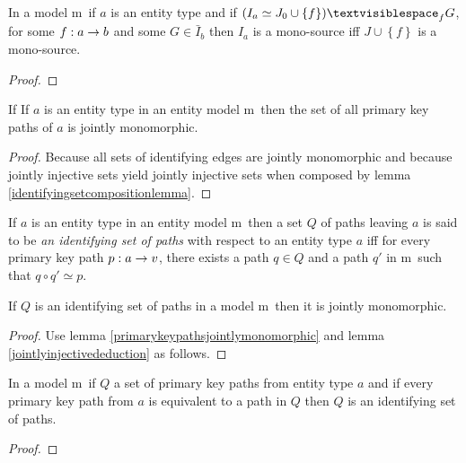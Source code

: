 \documentclass[10pt,a4paper]{article}
\newcommand{\commentary}[1]{\marginpar{\footnotesize #1}}
\newcommand{\set}[1]{\left\{#1\right\}}
\newcommand{\genericmodel}{\mathcal{M}}
\renewcommand{\genericmodel}{{m}}
\newcommand{\term}[1]{\textit{{#1}}}
\begin{document}
\begin{lemma}
In a model \genericmodel\ if $a$ is an entity type and if $(I_a \simeq J_0 \cup \set{f})\textvisiblespace_f G$,
for some $f: a \rightarrow b$ and some $G \in \bar{I}_b$ then 
$I_a$ is a mono-source iff $J \cup \set{f}$ is a mono-source.
\end{lemma}
\begin{proof}
\end{proof} 


\begin{lemma}
\label{primarykeypathsjointlymonomorphic}
If If $a$ is an entity type in an entity model \genericmodel\ then the set of all primary key paths 
of $a$ is jointly monomorphic.
\end{lemma}
\begin{proof}
Because all sets of identifying edges are jointly monomorphic and because jointly injective sets
yield jointly injective sets when composed by lemma \ref{identifyingsetcompositionlemma}. \commentary{Do a better job of this proof.}
\end{proof}

\begin{definition}
If $a$ is an entity type in an entity model \genericmodel\ then a set $Q$ of paths 
leaving $a$ is said to be \term{an identifying set of paths} with respect 
to an entity type $a$ iff for every primary key path $p:a \rightarrow v$, there exists 
a path $q \in Q$ and a path $q'$ in \genericmodel\ such that $q \circ q' \simeq p$.
\end{definition}

\begin{lemma}
If $Q$ is an identifying set of paths in a model \genericmodel\ then it is jointly monomorphic.
\end{lemma}
\begin{proof}
Use lemma \ref{primarykeypathsjointlymonomorphic} and lemma \ref{jointlyinjectivededuction} as follows. 
\end{proof}




\begin{lemma} 
\label{primarypathrepresentativesidentifying}
In a model \genericmodel\ if $Q$ a set of primary key paths from entity type $a$ 
and if every primary key path from $a$ is equivalent to a path in $Q$ then
$Q$ is an identifying set of paths. 
\end{lemma}
\begin{proof}
\end{proof}
\end{document}
